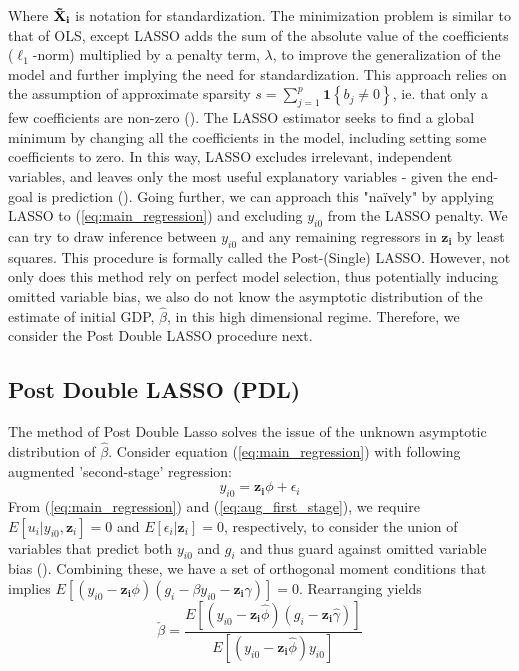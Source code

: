 \documentclass[11pt]{article}
\begin{document}
Where $\mathbf{\Tilde{X}_i}$ is notation for standardization. The minimization problem is similar to that of OLS, except LASSO adds the sum of the absolute value of the coefficients ($\ell_1$-norm) multiplied by a penalty term, $\lambda$, to improve the generalization of the model and further implying the need for standardization. This approach relies on the assumption of approximate sparsity $s=\sum_{j=1}^p \mathbf{1}\left\{b_j \neq 0\right\}$, ie. that only a few coefficients are non-zero (\cite{belloni2014_restud}).  The LASSO estimator seeks to find a global minimum by changing all the coefficients in the model, including setting some coefficients to zero. In this way, LASSO excludes irrelevant, independent variables, and leaves only the most useful explanatory variables - given the end-goal is prediction (\cite{belloni2014_perspectives}). Going further, we can approach this "naïvely" by applying LASSO to (\ref{eq:main_regression}) and excluding $y_{i0}$ from the LASSO penalty. We can try to draw inference between $y_{i0}$ and any remaining regressors in $\mathbf{z_i}$ by least squares. This procedure is formally called the Post-(Single) LASSO. However, not only does this method rely on perfect model selection, thus potentially inducing omitted variable bias, we also do not know the asymptotic distribution of the estimate of initial GDP, $\hat{\beta}$, in this high dimensional regime. Therefore, we consider the Post Double LASSO procedure next. 

\subsection{Post Double LASSO (PDL)}

The method of Post Double Lasso solves the issue of the unknown asymptotic distribution of $\hat{\beta}$. Consider equation (\ref{eq:main_regression}) with following augmented 'second-stage' regression:
\begin{equation}
    \label{eq:aug_first_stage}
    y_{i0}=\mathbf{z_i}\phi+\epsilon_i
\end{equation}
From (\ref{eq:main_regression}) and (\ref{eq:aug_first_stage}), we require $E[u_i|y_{i0},\mathbf{z}_i]=0$ and $E[\epsilon_i|\mathbf{z}_i]=0$, respectively, to consider the union of variables that predict both $y_{i0}$ and $g_i$ and thus guard against omitted variable bias (\cite{belloni2014_perspectives}). Combining these, we have a set of orthogonal moment conditions that implies $E[(y_{i0}-\mathbf{z_i}\phi)(g_i-\beta y_{i0}-\mathbf{z_i}\gamma)]=0$. Rearranging yields
\begin{equation}
    \label{eq:post_double_lasso_moment_cond}
    \check{\beta}=\frac{E[(y_{i0}-\mathbf{z_i}\hat{\phi})(g_i-\mathbf{z_i}\hat{\gamma})]}{E[(y_{i0}-\mathbf{z_i}\hat{\phi})y_{i0}]}
\end{equation}
\end{document}
